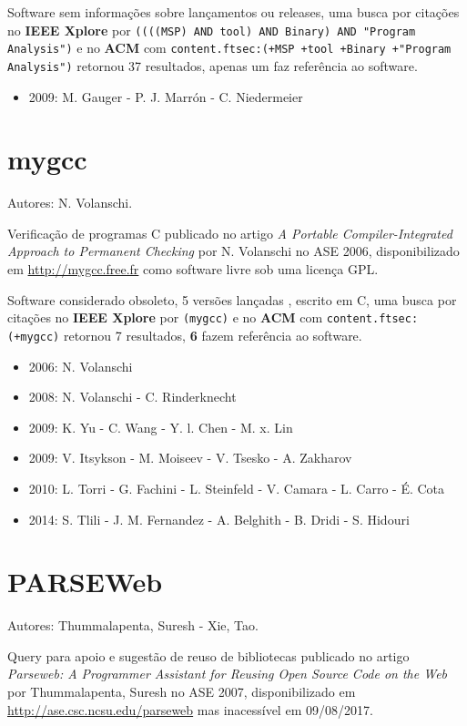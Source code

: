 Software sem informações sobre lançamentos ou releases,
uma busca por citações no {\bf IEEE Xplore} por
\texttt{((((MSP) AND tool) AND Binary) AND "Program Analysis")}
e no {\bf ACM} com
\texttt{content.ftsec:(+MSP +tool +Binary +"Program Analysis")}
retornou
37 resultados,
apenas um faz referência ao software.

\begin{itemize}
\item 2009: M. Gauger - P. J. Marrón - C. Niedermeier
\end{itemize}

\section{mygcc}

Autores:
N. Volanschi.

Verificação de programas C
publicado no artigo {\it A Portable Compiler-Integrated Approach to Permanent Checking}
por N. Volanschi
no ASE 2006,
disponibilizado em \url{http://mygcc.free.fr}
como software livre
sob uma licença GPL.

Software considerado obsoleto,
5 versões lançadas
,
escrito em C,
uma busca por citações no {\bf IEEE Xplore} por
\texttt{(mygcc)}
e no {\bf ACM} com
\texttt{content.ftsec:(+mygcc)}
retornou
7 resultados,
{\bf 6} fazem referência ao software.

\begin{itemize}
\item 2006: N. Volanschi
\item 2008: N. Volanschi - C. Rinderknecht
\item 2009: K. Yu - C. Wang - Y. l. Chen - M. x. Lin
\item 2009: V. Itsykson - M. Moiseev - V. Tsesko - A. Zakharov
\item 2010: L. Torri - G. Fachini - L. Steinfeld - V. Camara - L. Carro - É. Cota
\item 2014: S. Tlili - J. M. Fernandez - A. Belghith - B. Dridi - S. Hidouri
\end{itemize}

\section{PARSEWeb}

Autores:
Thummalapenta, Suresh - Xie, Tao.

Query para apoio e sugestão de reuso de bibliotecas
publicado no artigo {\it Parseweb: A Programmer Assistant for Reusing Open Source Code on the Web}
por Thummalapenta, Suresh
no ASE 2007,
disponibilizado em \url{http://ase.csc.ncsu.edu/parseweb}
mas inacessível em 09/08/2017.

